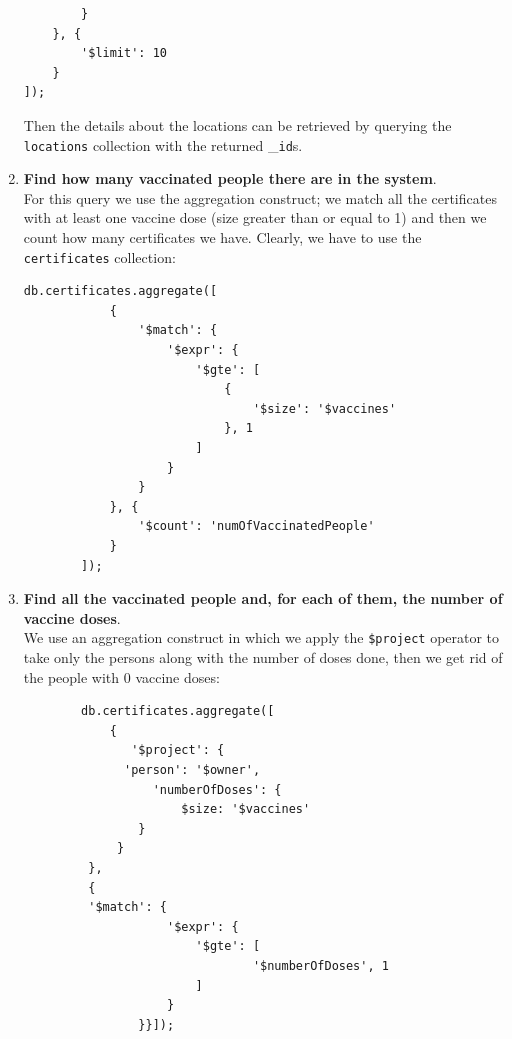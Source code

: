 \documentclass{article}
\begin{document}
\begin{enumerate}
\begin{lstlisting}
        }
    }, {
        '$limit': 10
    }
]);
    \end{lstlisting}
    Then the details about the locations can be retrieved by querying the \verb|locations| collection with the returned \_\verb|id|s.
    \item \textbf{Find how many vaccinated people there are in the system}.\\
    For this query we use the aggregation construct; we match all the certificates with at least one vaccine dose (size greater than or equal to 1) and then we count how many certificates we have. Clearly, we have to use the \verb|certificates| collection:
\begin{lstlisting}
db.certificates.aggregate([
            {
                '$match': {
                    '$expr': {
                        '$gte': [
                            {
                                '$size': '$vaccines'
                            }, 1
                        ]
                    }
                }
            }, {
                '$count': 'numOfVaccinatedPeople'
            }
        ]);
\end{lstlisting}
    \item \textbf{Find all the vaccinated people and, for each of them, the number of vaccine doses}.\\
    We use an aggregation construct in which we apply the \verb|$project| operator to take only the persons along with the number of doses done, then we get rid of the people with 0 vaccine doses:
    \\
    \begin{lstlisting}
        db.certificates.aggregate([
            {
               '$project': {
              'person': '$owner',
                  'numberOfDoses': {
                      $size: '$vaccines'
                }
             }
         },
         {
         '$match': {
                    '$expr': {
                        '$gte': [
                                '$numberOfDoses', 1
                        ]
                    }
                }}]); 
    \end{lstlisting}
    \end{enumerate}
\end{document}
